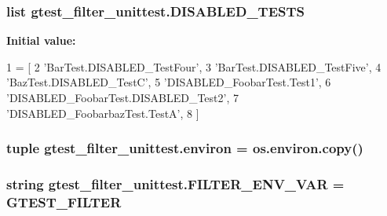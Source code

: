 \subsubsection[{D\+I\+S\+A\+B\+L\+E\+D\+\_\+\+T\+E\+S\+T\+S}]{\setlength{\rightskip}{0pt plus 5cm}list gtest\+\_\+filter\+\_\+unittest.\+D\+I\+S\+A\+B\+L\+E\+D\+\_\+\+T\+E\+S\+T\+S}\label{namespacegtest__filter__unittest_affe760ab1e8c4c7b61566076c37c1d69}
{\bfseries Initial value\+:}
\begin{DoxyCode}
1 = [
2     \textcolor{stringliteral}{'BarTest.DISABLED\_TestFour'},
3     \textcolor{stringliteral}{'BarTest.DISABLED\_TestFive'},
4     \textcolor{stringliteral}{'BazTest.DISABLED\_TestC'},
5     \textcolor{stringliteral}{'DISABLED\_FoobarTest.Test1'},
6     \textcolor{stringliteral}{'DISABLED\_FoobarTest.DISABLED\_Test2'},
7     \textcolor{stringliteral}{'DISABLED\_FoobarbazTest.TestA'},
8     ]
\end{DoxyCode}
\hypertarget{namespacegtest__filter__unittest_a39a358caaa1ecaa4f0403093c48f08ee}{}
\subsubsection[{environ}]{\setlength{\rightskip}{0pt plus 5cm}tuple gtest\+\_\+filter\+\_\+unittest.\+environ = os.\+environ.\+copy()}\label{namespacegtest__filter__unittest_a39a358caaa1ecaa4f0403093c48f08ee}
\hypertarget{namespacegtest__filter__unittest_a3dbe99165209787d4d138d30673c95f5}{}
\subsubsection[{F\+I\+L\+T\+E\+R\+\_\+\+E\+N\+V\+\_\+\+V\+A\+R}]{\setlength{\rightskip}{0pt plus 5cm}string gtest\+\_\+filter\+\_\+unittest.\+F\+I\+L\+T\+E\+R\+\_\+\+E\+N\+V\+\_\+\+V\+A\+R = \textquotesingle{}G\+T\+E\+S\+T\+\_\+\+F\+I\+L\+T\+E\+R\textquotesingle{}}\label{namespacegtest__filter__unittest_a3dbe99165209787d4d138d30673c95f5}
\hypertarget{namespacegtest__filter__unittest_a90fceef31e3329f712cd41244c5e923d}{}
